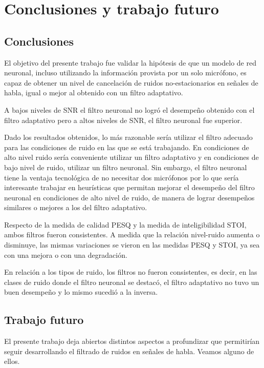 \section{Conclusiones y trabajo futuro}

\subsection{Conclusiones}

El objetivo del presente trabajo fue validar la hipótesis de que un modelo de red neuronal, incluso utilizando la información provista por un solo micrófono, es capaz de obtener un nivel de cancelación de ruidos no-estacionarios en señales de habla, igual o mejor al obtenido con un filtro adaptativo.

A bajos niveles de SNR el filtro neuronal no logró el desempeño obtenido con el filtro adaptativo pero a altos niveles de SNR, el filtro neuronal fue superior.

Dado los resultados obtenidos, lo más razonable sería utilizar el filtro adecuado para las condiciones de ruido en las que se está trabajando. En condiciones de alto nivel ruido sería conveniente utilizar un filtro adaptativo y en condiciones de bajo nivel de ruido, utilizar un filtro neuronal. Sin embargo, el filtro neuronal tiene la ventaja tecnológica de no necesitar dos micrófonos por lo que sería interesante trabajar en heurísticas que permitan mejorar el desempeño del filtro neuronal en condiciones de alto nivel de ruido, de manera de lograr desempeños similares o mejores a los del filtro adaptativo.

Respecto de la medida de calidad PESQ y la medida de inteligibilidad STOI, ambos filtros fueron consistentes. A medida que la relación nivel-ruido aumenta o disminuye, las mismas variaciones se vieron en las medidas PESQ y STOI, ya sea con una mejora o con una degradación.

En relación a los tipos de ruido, los filtros no fueron consistentes, es decir, en las clases de ruido donde el filtro neuronal se destacó, el filtro adaptativo no tuvo un buen desempeño y lo mismo sucedió a la inversa. 

\subsection{Trabajo futuro}

El presente trabajo deja abiertos distintos aspectos a profundizar que permitirían seguir desarrollando el filtrado de ruidos en señales de habla. Veamos alguno de ellos.

